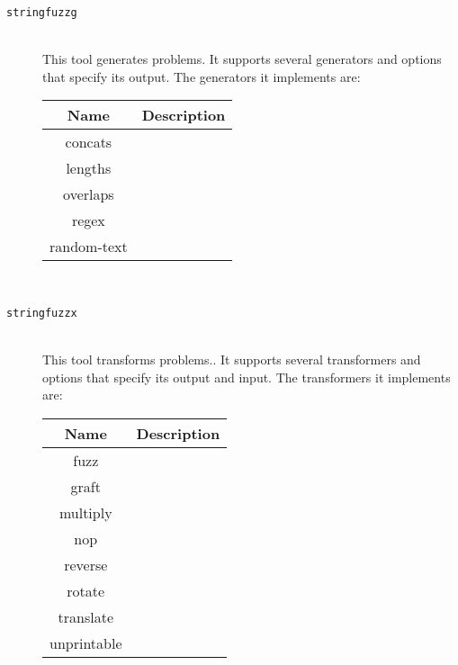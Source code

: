     \begin{description}

        \item[\texttt{stringfuzzg}] \hfill \\
            This tool generates \smt{} problems. It supports several generators and options that specify its output. The generators it implements are: \\


            \begin{tabular}{|c|c|}
                \hline
                \textbf{Name} & \textbf{Description} \\ \hline
                concats       & \\ \hline
                lengths       & \\ \hline
                overlaps      & \\ \hline
                regex         & \\ \hline
                random-text   & \\ \hline
            \end{tabular}

            \hfill \\

        \item[\texttt{stringfuzzx}] \hfill \\
            This tool transforms \smt{} problems.. It supports several transformers and options that specify its output and input. The transformers it implements are: \\


            \begin{tabular}{|c|c|}
                \hline
                \textbf{Name} & \textbf{Description} \\ \hline
                fuzz          & \\ \hline
                graft         & \\ \hline
                multiply      & \\ \hline
                nop           & \\ \hline
                reverse       & \\ \hline
                rotate        & \\ \hline
                translate     & \\ \hline
                unprintable   & \\ \hline
            \end{tabular}


\end{description}
